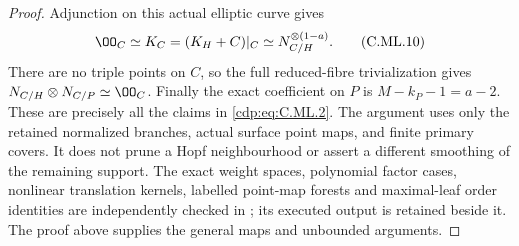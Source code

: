 \begin{proof}
Adjunction on this actual elliptic curve gives
\[
     \OO_C\simeq K_C=(K_H+C)|_C
                          \simeq N_{C/H}^{\otimes(1-a)}.
\tag{C.ML.10}\label{cdp:eq:C.ML.10}
\]
There are no triple points on \(C\), so the
full reduced-fibre trivialization gives
\(N_{C/H}\otimes N_{C/P}\simeq\OO_C\).
Finally the exact coefficient on \(P\) is
\(M-k_P-1=a-2\). These are precisely all the
claims in \eqref{cdp:eq:C.ML.2}. The argument uses only the
retained normalized branches, actual surface
point maps, and finite primary covers. It
does not prune a Hopf neighbourhood or assert
a different smoothing of the remaining support.
The exact weight spaces, polynomial factor cases,
nonlinear translation kernels, labelled point-map
forests and maximal-leaf order identities are
independently checked in
; its executed
output is retained beside it. The proof above supplies
the general maps and unbounded arguments.
\end{proof}


